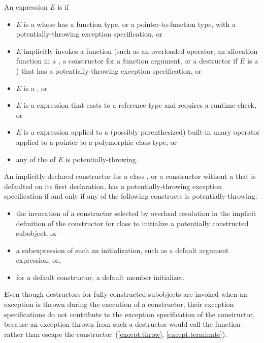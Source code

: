 \pnum
An expression $E$ is
 if
\begin{itemize}
\item
$E$ is a 
whose 
has a function type,
or a pointer-to-function type,
with a potentially-throwing exception specification,
or
\item
$E$ implicitly invokes a function
(such as an overloaded operator,
an allocation function in a ,
a constructor for a function argument,
or a destructor if $E$ is a )
that has a potentially-throwing exception specification,
or
\item
$E$ is a ,
or
\item
$E$ is a  expression that casts to a reference type and
requires a runtime check,
or
\item
$E$ is a  expression applied to a
(possibly parenthesized) built-in unary \tcode{*} operator
applied to a pointer to a
polymorphic class type,
or
\item
any of the 
of $E$ is potentially-throwing.
\end{itemize}

\pnum
An implicitly-declared constructor for a class ,
or a constructor without a 
that is defaulted on its first declaration,
has a potentially-throwing exception specification
if and only if
any of the following constructs is potentially-throwing:
\begin{itemize}
\item
the invocation of a constructor selected by overload resolution
in the implicit definition of the constructor
for class 
to initialize a potentially constructed subobject, or
\item
a subexpression of such an initialization,
such as a default argument expression, or,
\item
for a default constructor, a default member initializer.
\end{itemize}
\begin{note}
Even though destructors for fully-constructed subobjects
are invoked when an exception is thrown
during the execution of a constructor,
their exception specifications do not contribute
to the exception specification of the constructor,
because an exception thrown from such a destructor
would call the function 
rather than escape the constructor~(\ref{except.throw}, \ref{except.terminate}).
\end{note}

